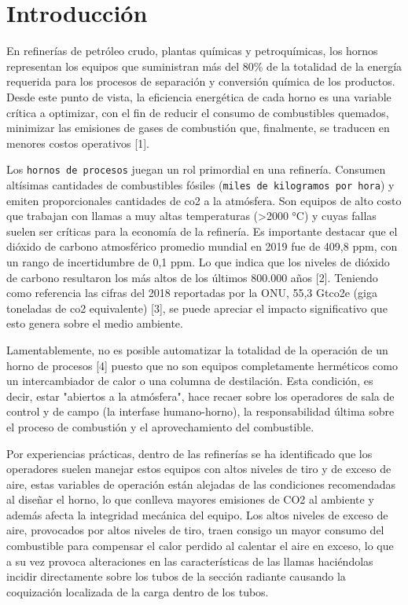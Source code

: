 \chapter*{Introducción}

\par En refinerías de petróleo crudo, plantas químicas y petroquímicas, los hornos representan los equipos que suministran más del 80\% de la totalidad de la energía requerida para los procesos de separación y conversión química de los productos. Desde este punto de vista, la eficiencia energética de cada horno es una variable crítica a optimizar, con el fin de reducir el consumo de combustibles quemados, minimizar las emisiones de gases de combustión que, finalmente, se traducen en menores costos operativos [1].

\par Los \texttt{hornos de procesos} juegan un rol primordial en una refinería. Consumen altísimas cantidades de combustibles fósiles ({\tt miles de kilogramos por hora}) y emiten proporcionales cantidades de \ac{co2} a la atmósfera. Son equipos de alto costo que trabajan con llamas a muy altas temperaturas (\textgreater 2000 °C) y cuyas fallas suelen ser críticas para la economía de la refinería. Es importante destacar que el dióxido de carbono atmosférico promedio mundial en 2019 fue de 409,8 ppm, con un rango de incertidumbre de 0,1 ppm. Lo que indica que los niveles de dióxido de carbono resultaron los más altos de los últimos 800.000 años [2]. Teniendo como referencia las cifras del 2018 reportadas por la \ac{ONU}, 55,3 Gt\ac{co2}e (giga toneladas de \ac{co2} equivalente) [3], se puede apreciar el impacto significativo que esto genera sobre el medio ambiente. 

\par Lamentablemente, no es posible automatizar la totalidad de la operación de un horno de procesos [4] puesto que no son equipos completamente herméticos como un intercambiador de calor o una columna de destilación. Esta condición, es decir, estar "abiertos a la atmósfera", hace recaer sobre los operadores de sala de control y de campo (la interfase humano-horno), la responsabilidad última sobre el proceso de combustión y el aprovechamiento del combustible.  

\par Por experiencias prácticas, dentro de las refinerías se ha identificado que los operadores suelen manejar estos equipos con altos niveles de tiro y de exceso de aire, estas variables de operación están alejadas de las condiciones recomendadas al diseñar el horno, lo que conlleva mayores emisiones de CO2 al ambiente y además afecta la integridad mecánica del equipo. Los altos niveles de exceso de aire, provocados por altos niveles de tiro, traen consigo un mayor consumo del combustible para compensar el calor perdido al calentar el aire en exceso, lo que a su vez provoca alteraciones en las características de las llamas haciéndolas incidir directamente sobre los tubos de la sección radiante causando la coquización localizada de la carga dentro de los tubos. 

